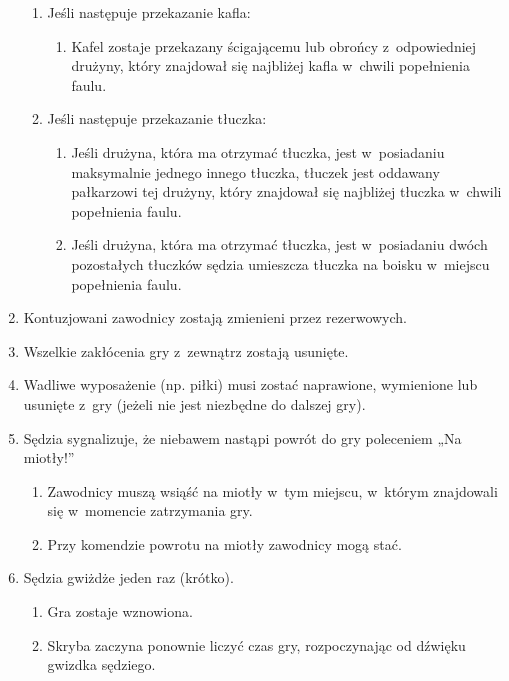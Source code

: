 \documentclass[12pt,a4paper]{article}
\begin{document}
\begin{enumerate}
	      \begin{enumerate}
		      \item
		            Jeśli następuje przekazanie kafla:

		            \begin{enumerate}
			            \item
			                  Kafel zostaje przekazany ścigającemu lub obrońcy z~odpowiedniej
			                  drużyny, który znajdował się najbliżej kafla w~chwili popełnienia
			                  faulu.
		            \end{enumerate}
		      \item
		            Jeśli następuje przekazanie tłuczka:

		            \begin{enumerate}
			            \item
			                  Jeśli drużyna, która ma otrzymać tłuczka, jest w~posiadaniu
			                  maksymalnie jednego innego tłuczka, tłuczek jest oddawany
			                  pałkarzowi tej drużyny, który znajdował się najbliżej tłuczka w~chwili popełnienia faulu.
			            \item
			                  Jeśli drużyna, która ma otrzymać tłuczka, jest w~posiadaniu dwóch
			                  pozostałych tłuczków sędzia umieszcza tłuczka na boisku w~miejscu
			                  popełnienia faulu.
		            \end{enumerate}
	      \end{enumerate}
	\item
	      Kontuzjowani zawodnicy zostają zmienieni przez rezerwowych.
	\item
	      Wszelkie zakłócenia gry z~zewnątrz zostają usunięte.
	\item
	      Wadliwe wyposażenie (np. piłki) musi zostać naprawione, wymienione lub
	      usunięte z~gry (jeżeli nie jest niezbędne do dalszej gry).
	\item
	      Sędzia sygnalizuje, że niebawem nastąpi powrót do gry poleceniem „Na
	      miotły!''

	      \begin{enumerate}
		      \item
		            Zawodnicy muszą wsiąść na miotły w~tym miejscu, w~którym znajdowali
		            się w~momencie zatrzymania gry.
		      \item
		            Przy komendzie powrotu na miotły zawodnicy mogą stać.
	      \end{enumerate}
	\item
	      Sędzia gwiżdże jeden raz (krótko).

	      \begin{enumerate}
		      \item
		            Gra zostaje wznowiona.
		      \item
		            Skryba zaczyna ponownie liczyć czas gry, rozpoczynając od dźwięku
		            gwizdka sędziego.
	      \end{enumerate}
\end{enumerate}
\end{document}

